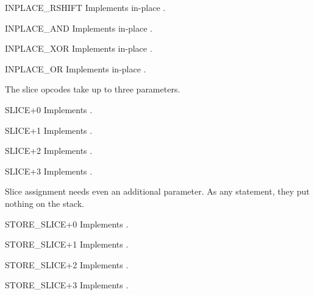 \begin{opcodedesc}{INPLACE_RSHIFT}{}
Implements in-place .
\end{opcodedesc}

\begin{opcodedesc}{INPLACE_AND}{}
Implements in-place .
\end{opcodedesc}

\begin{opcodedesc}{INPLACE_XOR}{}
Implements in-place .
\end{opcodedesc}

\begin{opcodedesc}{INPLACE_OR}{}
Implements in-place .
\end{opcodedesc}

The slice opcodes take up to three parameters.

\begin{opcodedesc}{SLICE+0}{}
Implements .
\end{opcodedesc}

\begin{opcodedesc}{SLICE+1}{}
Implements .
\end{opcodedesc}

\begin{opcodedesc}{SLICE+2}{}
Implements .
\end{opcodedesc}

\begin{opcodedesc}{SLICE+3}{}
Implements .
\end{opcodedesc}

Slice assignment needs even an additional parameter.  As any statement,
they put nothing on the stack.

\begin{opcodedesc}{STORE_SLICE+0}{}
Implements .
\end{opcodedesc}

\begin{opcodedesc}{STORE_SLICE+1}{}
Implements .
\end{opcodedesc}

\begin{opcodedesc}{STORE_SLICE+2}{}
Implements .
\end{opcodedesc}

\begin{opcodedesc}{STORE_SLICE+3}{}
Implements .
\end{opcodedesc}

